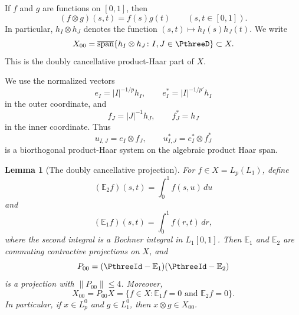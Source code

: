 \documentclass[11pt,reqno]{amsart}
\makeatletter
\theoremstyle{plain}
\newtheorem{lemma}[lemma]{Lemma}
\theoremstyle{definition}
\newcounter{problempaper}
\newenvironment{problempaperbody}{%
  \setcounter{subsection}{0}%
  \setcounter{subsubsection}{0}%
  \setcounter{paragraph}{0}%
  \renewcommand{\thesubsection}{\arabic{subsection}}%
  \renewcommand{\thesubsubsection}{\thesubsection.\arabic{subsubsection}}%
  \renewcommand{\theparagraph}{\thesubsubsection.\arabic{paragraph}}%
  \let\problem@outersection\section
  \let\problem@outersubsection\subsection
  \let\problem@outersubsubsection\subsubsection
  \let\problem@outerparagraph\paragraph
  \let\section\problem@papersection
  \let\subsection\problem@papersubsection
  \let\subsubsection\problem@papersubsubsection
}{%
  \let\section\problem@outersection
  \let\subsection\problem@outersubsection
  \let\subsubsection\problem@outersubsubsection
  \let\paragraph\problem@outerparagraph
}
\newcommand{\problem@target}[2]{%
  \hypertarget{problem-\theproblempaper-#1-#2}{}%
}
\newcommand{\problem@paperheading}[3]{%
  \par\bigskip
  \problem@target{#1}{#2}%
  \noindent{\large\bfseries #2.\quad #3\par}%
  \nobreak\smallskip
}
\newcommand{\problem@papersubheading}[3]{%
  \par\medskip
  \problem@target{#1}{#2}%
  \noindent{\normalsize\bfseries #2.\quad #3\par}%
  \nobreak\smallskip
}
\newcommand{\problem@papersubsubheading}[3]{%
  \par\smallskip
  \problem@target{#1}{#2}%
  \noindent{\normalsize\itshape #2.\quad #3.\ }%
}
\def\problem@papersection{%
  \@ifstar{\problem@papersectionstar}{\problem@papersectionnostar}%
}
\def\problem@papersectionstar#1{%
  \par\bigskip\noindent{\large\bfseries #1\par}\nobreak\smallskip
}
\def\problem@papersectionnostar#1{%
  \refstepcounter{subsection}%
  \setcounter{subsubsection}{0}%
  \setcounter{paragraph}{0}%
  \problem@paperheading{section}{\thesubsection}{#1}%
  \problem@writecontentsline{section}{\thesubsection}{#1}%
}
\def\problem@papersubsection{%
  \@ifstar{\problem@papersubsectionstar}{\problem@papersubsectionnostar}%
}
\def\problem@papersubsectionstar#1{%
  \par\medskip\noindent{\normalsize\bfseries #1\par}\nobreak\smallskip
}
\def\problem@papersubsectionnostar#1{%
  \refstepcounter{subsubsection}%
  \setcounter{paragraph}{0}%
  \problem@papersubheading{subsection}{\thesubsubsection}{#1}%
  \problem@writecontentsline{subsection}{\thesubsubsection}{#1}%
}
\def\problem@papersubsubsection{%
  \@ifstar{\problem@papersubsubsectionstar}{\problem@papersubsubsectionnostar}%
}
\def\problem@papersubsubsectionstar#1{%
  \par\smallskip\noindent{\normalsize\itshape #1.\ }%
}
\def\problem@papersubsubsectionnostar#1{%
  \refstepcounter{paragraph}%
  \problem@papersubsubheading{subsubsection}{\theparagraph}{#1}%
  \problem@writecontentsline{subsubsection}{\theparagraph}{#1}%
}
\newcommand{\problem@writecontentsline}[3]{%
  \begingroup
  \protected@write\@auxout{}{%
    \string\problemcontentsentry{\theproblempaper}{#1}{#2}{#3}{\thepage}%
  }%
  \endgroup
}
\newcommand{\problemcontentsentry}[5]{%
  \@ifundefined{problemcontents@#1}{%
    \expandafter\gdef\csname problemcontents@#1\endcsname{}%
  }{}%
  \expandafter\g@addto@macro\csname problemcontents@#1\endcsname{%
    \problemcontentsline{#1}{#2}{#3}{#4}{#5}%
  }%
}
\newcommand{\problemcontentslink}[4]{%
  \hyperlink{problem-#1-#2-#3}{#4}%
}
\newcommand{\problemcontentsline}[5]{%
  \ifstrequal{#2}{section}{%
    \par\noindent
    \problemcontentslink{#1}{#2}{#3}{\makebox[2.5em][l]{#3}#4}%
    \nobreak\dotfill
    \problemcontentslink{#1}{#2}{#3}{#5}\par
  }{%
    \ifstrequal{#2}{subsection}{%
      \par\noindent\hspace*{1.5em}%
      \problemcontentslink{#1}{#2}{#3}{\makebox[3.5em][l]{#3}#4}%
      \nobreak\dotfill
      \problemcontentslink{#1}{#2}{#3}{#5}\par
    }{%
      \par\noindent\hspace*{3em}%
      \problemcontentslink{#1}{#2}{#3}{\makebox[4.5em][l]{#3}#4}%
      \nobreak\dotfill
      \problemcontentslink{#1}{#2}{#3}{#5}\par
    }%
  }%
}
\makeatother
\begin{document}
\begin{problempaperbody}
If $f$ and $g$ are functions on $[0,1]$, then
\begin{equation*}
        (f\otimes g)(s,t)=f(s)g(t)\qquad (s,t\in[0,1]).
\end{equation*}
In particular, $h_I\otimes h_J$ denotes the function $(s,t)\longmapsto h_I(s)h_J(t)$. We write
\begin{equation*}
        X_{00}=\overline{\operatorname{span}}\{h_I\otimes h_J\colon I,J\in\PthreeD\}
        \subset X .
\end{equation*}
This is the doubly cancellative product-Haar part of $X$.

We use the normalized vectors
\begin{equation*}
        e_I=|I|^{-1/p}h_I,\qquad e_I^*=|I|^{-1/p'}h_I
\end{equation*}
in the outer coordinate, and
\begin{equation*}
        f_J=|J|^{-1}h_J,\qquad f_J^*=h_J
\end{equation*}
in the inner coordinate. Thus
\begin{equation*}
        u_{I,J}=e_I\otimes f_J,\qquad u_{I,J}^*=e_I^*\otimes f_J^*
\end{equation*}
is a biorthogonal product-Haar system on the algebraic product Haar span.

\begin{lemma}[The doubly cancellative projection]
\label{p3:lem:x00-projection}
For $f\in X=L_p(L_1)$, define
\begin{equation*}
        (\mathbb E_2f)(s,t)=\int_0^1 f(s,u)\,du
\end{equation*}
and
\begin{equation*}
        (\mathbb E_1f)(s,t)=\int_0^1 f(r,t)\,dr,
\end{equation*}
where the second integral is a Bochner integral in $L_1[0,1]$.  Then $\mathbb E_1$ and $\mathbb E_2$ are commuting contractive projections on $X$, and
\begin{equation*}
        P_{00}=(\PthreeId-\mathbb E_1)(\PthreeId-\mathbb E_2)
\end{equation*}
is a projection with $\|P_{00}\|\leq4$.  Moreover,
\begin{equation*}
        X_{00}=P_{00}X
        =\{f\in X:\mathbb E_1f=0\text{ and }\mathbb E_2f=0\}.
\end{equation*}
In particular, if $x\in L_p^0$ and $g\in L_1^0$, then $x\otimes g\in X_{00}$.
\end{lemma}


\end{problempaperbody}
\end{document}
